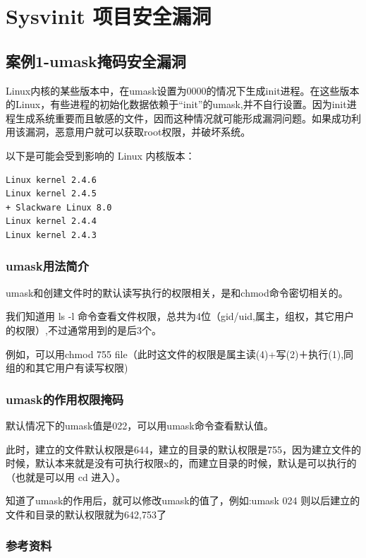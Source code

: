 \chapter{Sysvinit 项目安全漏洞}

\section{案例1-umask掩码安全漏洞}

Linux内核的某些版本中，在umask设置为0000的情况下生成init进程。在这些版本的Linux，有些进程的初始化数据依赖于``init''的umask,并不自行设置。因为init进程生成系统重要而且敏感的文件，因而这种情况就可能形成漏洞问题。如果成功利用该漏洞，恶意用户就可以获取root权限，并破坏系统。

以下是可能会受到影响的 Linux 内核版本：

{\begin{shaded}\begin{verbatim}
Linux kernel 2.4.6
Linux kernel 2.4.5
+ Slackware Linux 8.0
Linux kernel 2.4.4
Linux kernel 2.4.3
\end{verbatim}\end{shaded}}
\subsection{umask用法简介}

umask和创建文件时的默认读写执行的权限相关，是和chmod命令密切相关的。

我们知道用 ls -l
命令查看文件权限，总共为4位（gid/uid,属主，组权，其它用户的权限）,不过通常用到的是后3个。

例如，可以用chmod 755
file（此时这文件的权限是属主读(4)+写(2)＋执行(1),同组的和其它用户有读写权限)

\subsection{umask的作用权限掩码}

默认情况下的umask值是022，可以用umask命令查看默认值。

此时，建立的文件默认权限是644，建立的目录的默认权限是755，因为建立文件的时候，默认本来就是没有可执行权限x的，而建立目录的时候，默认是可以执行的（也就是可以用
cd 进入）。

知道了umask的作用后，就可以修改umask的值了，例如:umask 024
则以后建立的文件和目录的默认权限就为642,753了

\subsection{参考资料}

